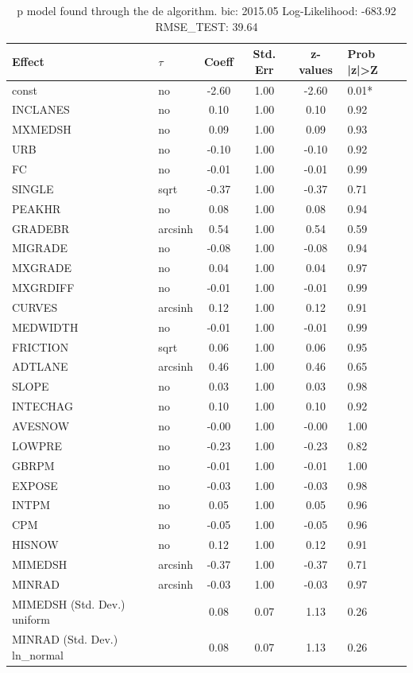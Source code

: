 \begin{table}
	\caption{p model found through the de algorithm. bic: 2015.05 Log-Likelihood: -683.92 RMSE_TEST: 39.64}
	\begin{center}
		\begin{tabular}{|l|l|c|c|c|l|}
			\hline
			Effect & $\tau$ & Coeff & Std. Err & z-values & Prob |z|>Z \\
			\hline
			const & no & -2.60 & 1.00 & -2.60 & 0.01* \\
			\hline
			INCLANES & no & 0.10 & 1.00 & 0.10 & 0.92 \\
			\hline
			MXMEDSH & no & 0.09 & 1.00 & 0.09 & 0.93 \\
			\hline
			URB & no & -0.10 & 1.00 & -0.10 & 0.92 \\
			\hline
			FC & no & -0.01 & 1.00 & -0.01 & 0.99 \\
			\hline
			SINGLE & sqrt & -0.37 & 1.00 & -0.37 & 0.71 \\
			\hline
			PEAKHR & no & 0.08 & 1.00 & 0.08 & 0.94 \\
			\hline
			GRADEBR & arcsinh & 0.54 & 1.00 & 0.54 & 0.59 \\
			\hline
			MIGRADE & no & -0.08 & 1.00 & -0.08 & 0.94 \\
			\hline
			MXGRADE & no & 0.04 & 1.00 & 0.04 & 0.97 \\
			\hline
			MXGRDIFF & no & -0.01 & 1.00 & -0.01 & 0.99 \\
			\hline
			CURVES & arcsinh & 0.12 & 1.00 & 0.12 & 0.91 \\
			\hline
			MEDWIDTH & no & -0.01 & 1.00 & -0.01 & 0.99 \\
			\hline
			FRICTION & sqrt & 0.06 & 1.00 & 0.06 & 0.95 \\
			\hline
			ADTLANE & arcsinh & 0.46 & 1.00 & 0.46 & 0.65 \\
			\hline
			SLOPE & no & 0.03 & 1.00 & 0.03 & 0.98 \\
			\hline
			INTECHAG & no & 0.10 & 1.00 & 0.10 & 0.92 \\
			\hline
			AVESNOW & no & -0.00 & 1.00 & -0.00 & 1.00 \\
			\hline
			LOWPRE & no & -0.23 & 1.00 & -0.23 & 0.82 \\
			\hline
			GBRPM & no & -0.01 & 1.00 & -0.01 & 1.00 \\
			\hline
			EXPOSE & no & -0.03 & 1.00 & -0.03 & 0.98 \\
			\hline
			INTPM & no & 0.05 & 1.00 & 0.05 & 0.96 \\
			\hline
			CPM & no & -0.05 & 1.00 & -0.05 & 0.96 \\
			\hline
			HISNOW & no & 0.12 & 1.00 & 0.12 & 0.91 \\
			\hline
			MIMEDSH & arcsinh & -0.37 & 1.00 & -0.37 & 0.71 \\
			\hline
			MINRAD & arcsinh & -0.03 & 1.00 & -0.03 & 0.97 \\
			\hline
			MIMEDSH (Std. Dev.) uniform &  & 0.08 & 0.07 & 1.13 & 0.26 \\
			\hline
			MINRAD (Std. Dev.) ln_normal &  & 0.08 & 0.07 & 1.13 & 0.26 \\
			\hline
		\end{tabular}
	\end{center}
\end{table}